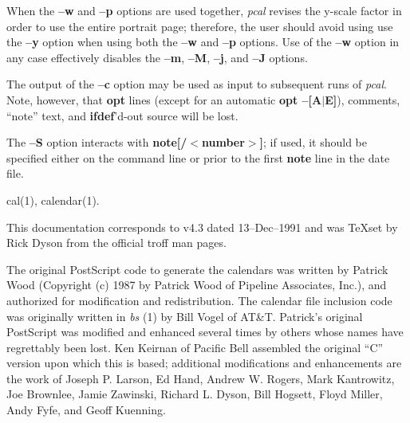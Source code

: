 When the {\bf --w} and {\bf --p} options are used together, {\it pcal}
revises the y-scale factor in order to use the entire portrait page;
therefore, the user should avoid using use the {\bf --y} option when
using both the {\bf --w} and {\bf --p} options.  Use of the {\bf --w}
option in any case effectively disables the {\bf --m}, {\bf --M}, {\bf
--j}, and {\bf --J} options.

The output of the {\bf --c} option may be used as input to subsequent
runs of {\it pcal}.  Note, however, that {\bf opt} lines (except for an
automatic {\bf opt --[A$|$E]}), comments, ``note'' text, and {\bf
ifdef}'d-out source will be lost.

The {\bf --S} option interacts with {\bf note[/$<$number$>$]};  if
used, it should be specified either on the command line or prior to the
first {\bf note} line in the date file.

cal(1), calendar(1).

This documentation corresponds to v4.3 dated 13--Dec--1991 and was
\TeX{}set by Rick Dyson from the official troff man pages.

The original PostScript code to generate the calendars was written by
Patrick Wood (Copyright (c) 1987 by Patrick Wood of Pipeline Associates,
Inc.), and authorized for modification and redistribution.  The calendar
file inclusion code was originally written in {\it bs} (1) by Bill Vogel
of AT\&T.  Patrick's original PostScript was modified and enhanced
several times by others whose names have regrettably been lost.  Ken
Keirnan of Pacific Bell assembled the original ``C'' version upon which
this is based; additional modifications and enhancements are the work of
Joseph P. Larson, Ed Hand, Andrew W. Rogers, Mark Kantrowitz, Joe
Brownlee, Jamie Zawinski, Richard L. Dyson, Bill Hogsett, Floyd Miller,
Andy Fyfe, and Geoff Kuenning.

